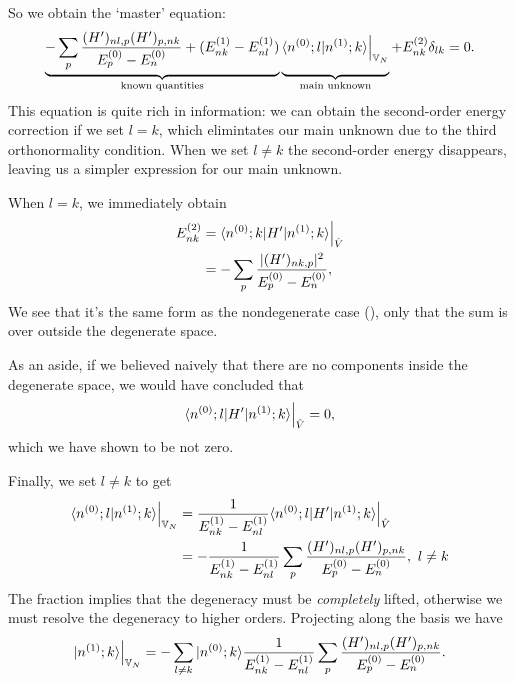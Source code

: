 So we obtain the `master' equation:
\begin{equation}
\underbrace{-\sum_p\frac{(H')_{nl,p}(H')_{p,nk}}{E_p^{(0)}-E_n^{(0)}}+(E_{nk}^{(1)}-E_{nl}^{(1)})}_{\text{known quantities}}\underbrace{\vphantom{-\sum_p\frac{(H')_{nl,p}(H')_{p,nk}}{E_p^{(0)}-E_n^{(0)}}}\lgl n^{(0)};l | n^{(1)};k \rgl\Big|_{\mathbb{V}_N}}_{\text{main unknown}}+E_{nk}^{(2)}\delta_{lk}=0.
\end{equation}
This equation is quite rich in information: we can obtain the second-order energy 
correction if we set $l=k$, which elimintates our main unknown due to the third 
orthonormality condition. When we set $l\neq	k$ the second-order energy disappears, 
leaving us a simpler expression for our main unknown.
\begin{thrm}
When $l=k$, we immediately obtain
\begin{equation}
\begin{aligned}
E^{(2)}_{nk}&=\langle n^{(0)};k | H'|n^{(1)};k \rangle\Big|_{\hat{V}}\\
&=-\sum_p\frac{|(H')_{nk,p}|^2}{E_p^{(0)}-E_n^{(0)}},
\end{aligned}
\end{equation}
We see that it's the same form as the nondegenerate case (), 
only that the sum is over outside the degenerate space. 
\end{thrm}
As an aside, if we believed naively that there are no components inside the degenerate 
space, we would have concluded that
\begin{equation}
\langle n^{(0)};l | H'|n^{(1)};k \rangle\Big|_{\hat{V}}=0, 
\end{equation}
which we have shown to be not zero. \par
Finally, we set $l\neq k$ to get
\begin{equation}
\begin{aligned}
\lgl n^{(0)};l | n^{(1)};k \rgl\Big|_{\mathbb{V}_N}&=\frac{1}{E_{nk}^{(1)}-E_{nl}^{(1)}}\lgl n^{(0)};l | H'|n^{(1)};k \rgl\Big|_{\hat{V}}\\
&=-\frac{1}{E_{nk}^{(1)}-E_{nl}^{(1)}}\sum_p\frac{(H')_{nl,p}(H')_{p,nk}}{E_p^{(0)}-E_n^{(0)}},\ l\neq k
\end{aligned}
\end{equation}
The fraction implies that the degeneracy must be \textit{completely} lifted, otherwise 
we must resolve the degeneracy to higher orders. Projecting along the basis we have
\begin{equation}
|n^{(1)};k\rangle\Big|_{\mathbb{V}_N}=-\sum_{l\neq k}|n^{(0)};k\rangle\frac{1}{E_{nk}^{(1)}-E_{nl}^{(1)}}\sum_p\frac{(H')_{nl,p}(H')_{p,nk}}{E_p^{(0)}-E_n^{(0)}}.
\end{equation}
